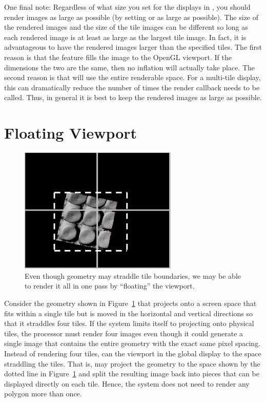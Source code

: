 One final note: Regardless of what size you set for the displays in
, you should render images as large as possible (by
setting  or  as
large as possible).  The size of the rendered images and the size of the
tile images can be different so long as each rendered image is at least as
large as the largest tile image.  In fact, it is advantageous to have the
rendered images larger than the specified tiles.  The first reason is that
the  feature fills the image to the
OpenGL viewport.  If the dimensions the two are the same, then no inflation
will actually take place.  The second reason is that \IceT will use the
entire renderable space.  For a multi-tile display, this can dramatically
reduce the number of times the render callback needs to be called.  Thus,
in general it is best to keep the rendered images as large as possible.


\section{Floating Viewport}
\label{sec:Customizing_Compositing:Floating_Viewport}

\begin{figure}
  \centering
  \includegraphics[width=3in]{images/FloatingViewport}
  \caption[Floating viewport.]{Even though geometry may straddle tile
    boundaries, we may be able to render it all in one pass by ``floating''
    the viewport.}
  \label{fig:FloatingViewport}
\end{figure}

Consider the geometry shown in Figure~\ref{fig:FloatingViewport} that
projects onto a screen space that fits within a single tile but is moved in
the horizontal and vertical directions so that it straddles four tiles.  If
the system limits itself to projecting onto physical tiles, the processor
must render four images even though it could generate a single
image that contains the entire geometry with the exact same pixel spacing.
Instead of rendering four tiles, \IceT can  the
viewport in the global display to the space straddling the tiles.  That is,
\IceT may project the geometry to the space shown by the dotted line
in Figure~\ref{fig:FloatingViewport} and split the resulting image back
into pieces that can be displayed directly on each tile.  Hence, the system
does not need to render any polygon more than once.


